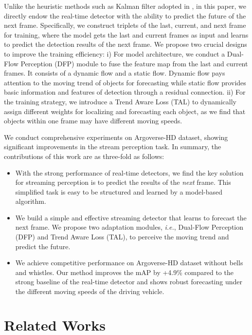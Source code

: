 \documentclass[10pt,twocolumn,letterpaper]{article}
\begin{document}
Unlike the heuristic methods such as Kalman filter \cite{kalman} adopted in \cite{streamer}, in this paper, we directly endow the real-time detector with the ability to predict the future of the next frame. Specifically, we construct triplets of the last, current, and next frame for training, where the model gets the last and current frames as input and learns to predict the detection results of the next frame. We propose two crucial designs to improve the training efficiency: i) For model architecture, we conduct a Dual-Flow Perception (DFP) module to fuse the feature map from the last and current frames. 
It consists of a dynamic flow and a static flow. Dynamic flow pays attention to the moving trend of objects for forecasting while static flow provides basic information and features of detection through a residual connection. 
ii) For the training strategy, we introduce a Trend Aware Loss (TAL) to dynamically assign different weights for localizing and forecasting each object, as we find that objects within one frame may have different moving speeds. 

We conduct comprehensive experiments on Argoverse-HD\cite{argoverse,streamer} dataset, showing significant improvements in the stream perception task. 
In summary, the contributions of this work are as three-fold as follows:
\begin{itemize}
\item With the strong performance of real-time detectors, we find the key solution for streaming perception is to predict the results of the \emph{next} frame. This simplified task is easy to be structured and learned by a model-based algorithm.  

\item We build a simple and effective streaming detector that learns to forecast the next frame. We propose two adaptation modules, \emph{i.e.}, Dual-Flow Perception (DFP) and Trend Aware Loss (TAL), to perceive the moving trend and predict the future.      

\item We achieve competitive performance on Argoverse-HD\cite{argoverse,streamer} dataset without bells and whistles. Our method improves the mAP by +4.9\% compared to the strong baseline of the real-time detector and shows robust forecasting under the different moving speeds of the driving vehicle. 
\end{itemize}


\section{Related Works}
\label{sec:related}
\end{document}
